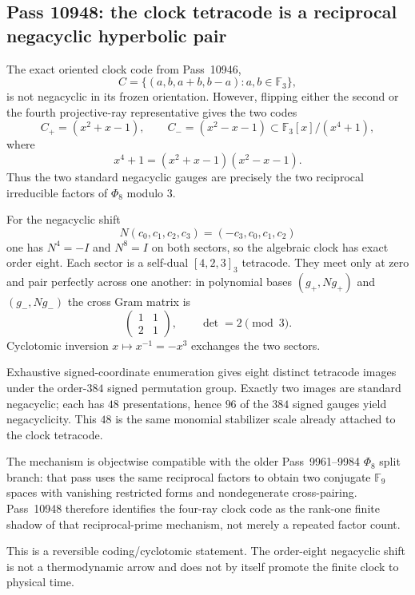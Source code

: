 \subsection{Pass 10948: the clock tetracode is a reciprocal negacyclic hyperbolic pair}

The exact oriented clock code from Pass~10946,
\[
 C=\{(a,b,a+b,b-a):a,b\in\mathbb F_3\},
\]
is not negacyclic in its frozen orientation.  However, flipping either the
second or the fourth projective-ray representative gives the two codes
\[
 C_+=(x^2+x-1),\qquad C_-=(x^2-x-1)
 \subset \mathbb F_3[x]/(x^4+1),
\]
where
\[
 x^4+1=(x^2+x-1)(x^2-x-1).
\]
Thus the two standard negacyclic gauges are precisely the two reciprocal
irreducible factors of $\Phi_8$ modulo $3$.

For the negacyclic shift
\[
 N(c_0,c_1,c_2,c_3)=(-c_3,c_0,c_1,c_2)
\]
one has $N^4=-I$ and $N^8=I$ on both sectors, so the algebraic clock has
exact order eight.  Each sector is a self-dual $[4,2,3]_3$ tetracode.
They meet only at zero and pair perfectly across one another: in polynomial
bases $(g_+,Ng_+)$ and $(g_-,Ng_-)$ the cross Gram matrix is
\[
 \begin{pmatrix}1&1\\2&1\end{pmatrix},
 \qquad \det=2\pmod3.
\]
Cyclotomic inversion $x\mapsto x^{-1}=-x^3$ exchanges the two sectors.

Exhaustive signed-coordinate enumeration gives eight distinct tetracode
images under the order-$384$ signed permutation group.  Exactly two images
are standard negacyclic; each has $48$ presentations, hence $96$ of the
$384$ signed gauges yield negacyclicity.  This $48$ is the same monomial
stabilizer scale already attached to the clock tetracode.

The mechanism is objectwise compatible with the older Pass~9961--9984
$\Phi_8$ split branch: that pass uses the same reciprocal factors to obtain
two conjugate $\mathbb F_9$ spaces with vanishing restricted forms and
nondegenerate cross-pairing.  Pass~10948 therefore identifies the four-ray
clock code as the rank-one finite shadow of that reciprocal-prime mechanism,
not merely a repeated factor count.

This is a reversible coding/cyclotomic statement.  The order-eight
negacyclic shift is not a thermodynamic arrow and does not by itself promote
the finite clock to physical time.

